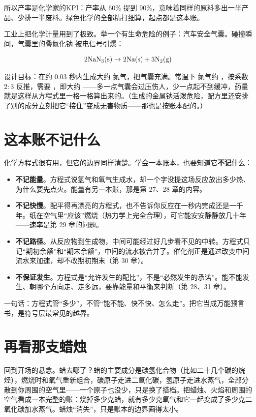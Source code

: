 所以产率是化学家的KPI：产率从 60\% 提到 90\%，意味着同样的原料多出一半产品、少排一半废料。绿色化学的全部精打细算，起点都是这本账。

工业上把化学计量用到了极致。举一个有生命危险的例子：汽车安全气囊。碰撞瞬间，气囊里的叠氮化钠  被电信号引爆：

\[\mathrm{2NaN_3(s)} \rightarrow \mathrm{2Na(s)} + \mathrm{3N_2(g)}\]

设计目标：在约 0.03 秒内生成大约  氮气，把气囊充满。常温下  氮气约 ，按系数 $2:3$ 反推，需要  ，即大约 ——多一点气囊会过压伤人，少一点起不到缓冲，药量就是这样从方程式里一格一格算出来的。（生成的金属钠活泼危险，配方里还安排了别的成分立刻把它“接住”变成无害物质——那也是按账本配的。）

\section{这本账不记什么}

化学方程式很有用，但它的边界同样清楚。学会一本账本，也要知道它\textbf{不记}什么：

\begin{itemize}[itemsep=2pt]
\item \textbf{不记能量}。方程式说氢气和氧气生成水，却一个字没提这场反应放出多少热、为什么要先点火。能量有另一本账，那是第 27、28 章的内容。
\item \textbf{不记快慢}。配平得再漂亮的方程式，也不告诉你反应在一秒内完成还是一千年。纸在空气里“应该”燃烧（热力学上完全合理），可它能安安静静放几十年——速率是第 29 章的问题。
\item \textbf{不记路径}。从反应物到生成物，中间可能经过好几步看不见的中转。方程式只记“期初余额”和“期末余额”，中间的流水被合并了。催化剂正是通过改变中间流水来加速，却不改期初期末（第 30 章）。
\item \textbf{不保证发生}。方程式是“允许发生的配比”，不是“必然发生的承诺”。能不能发生、朝哪个方向走、走多远，要靠能量和平衡来判断（第 28、31 章）。
\end{itemize}

一句话：方程式管“多少”，不管“能不能、快不快、怎么走”。把它当成万能预言书，是符号层最常见的越界。

\section{再看那支蜡烛}

回到开场的悬念。蜡去哪了？蜡的主要成分是碳氢化合物（比如二十几个碳的烷烃），燃烧时和氧气重新组合，碳原子走进二氧化碳，氢原子走进水蒸气，全部分散到你周围的空气里——一个原子也没少，只是换了搭档。把蜡烛、火焰和周围的空气看成一本完整的账：烧掉多少克蜡，就有多少克氧气和它一起变成了多少克二氧化碳加水蒸气。蜡烛“消失”，只是账本的边界画得太小。

